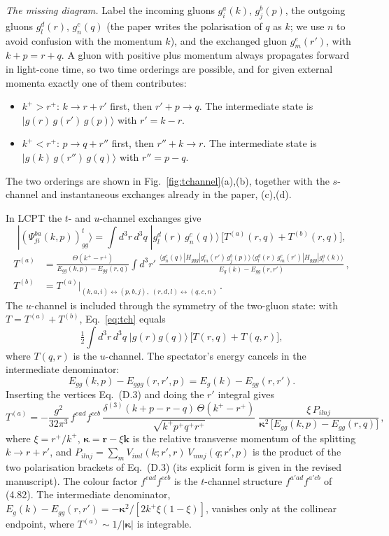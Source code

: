 \documentclass[11pt,a4paper]{article}
\newcommand{\bk}{\mathbf{k}}
\newcommand{\br}{\mathbf{r}}
\newcommand{\Hggg}{H_{ggg}}
\newcommand{\eq}[1]{Eq.~(#1)}
\begin{document}
\emph{The missing diagram.} Label the incoming gluons $g^a_i(k)$, $g^b_j(p)$, the outgoing gluons $g^d_l(r)$, $g^c_n(q)$ (the paper writes the polarisation of $q$ as $k$; we use $n$ to avoid confusion with the momentum $k$), and the exchanged gluon $g^e_m(r')$, with $k+p=r+q$. A gluon with positive plus momentum always propagates forward in light-cone time, so two time orderings are possible, and for given external momenta exactly one of them contributes:
\begin{itemize}[leftmargin=18pt,itemsep=2pt]
\item $k^+>r^+$: $k\to r+r'$ first, then $r'+p\to q$. The intermediate state is $|g(r)\,g(r')\,g(p)\rangle$ with $r'=k-r$.
\item $k^+<r^+$: $p\to q+r''$ first, then $r''+k\to r$. The intermediate state is $|g(k)\,g(r'')\,g(q)\rangle$ with $r''=p-q$.
\end{itemize}
The two orderings are shown in Fig.~\ref{fig:tchannel}(a),(b), together with the $s$-channel and instantaneous exchanges already in the paper, (c),(d).

\FigTchannel

In LCPT the $t$- and $u$-channel exchanges give
\begin{equation}
|(\Psi^{ba}_{ji}(k,p))^{t}_{gg}\rangle=\int d^3r\,d^3q\;|g^d_l(r)\,g^c_n(q)\rangle\,\big[T^{(a)}(r,q)+T^{(b)}(r,q)\big],
\label{eq:tch}
\end{equation}
\begin{align}
T^{(a)}&=\frac{\Theta(k^+-r^+)}{E_{gg}(k,p)-E_{gg}(r,q)}\int d^3r'\;\frac{\langle g^c_n(q)|\Hggg|g^e_m(r')\,g^b_j(p)\rangle\,\langle g^d_l(r)\,g^e_m(r')|\Hggg|g^a_i(k)\rangle}{E_g(k)-E_{gg}(r,r')}\,,\nonumber\\
T^{(b)}&=T^{(a)}\Big|_{(k,a,i)\leftrightarrow(p,b,j),\;(r,d,l)\leftrightarrow(q,c,n)}\,.
\label{eq:Tab}
\end{align}
The $u$-channel is included through the symmetry of the two-gluon state: with $T=T^{(a)}+T^{(b)}$, Eq.~\eqref{eq:tch} equals
\[
\tfrac12\int d^3r\,d^3q\;|g(r)g(q)\rangle\,\big[T(r,q)+T(q,r)\big],
\]
where $T(q,r)$ is the $u$-channel. The spectator's energy cancels in the intermediate denominator:
\[
E_{gg}(k,p)-E_{ggg}(r,r',p)=E_g(k)-E_{gg}(r,r').
\]
Inserting the vertices \eq{D.3} and doing the $r'$ integral gives
\begin{equation}
T^{(a)}=-\frac{g^2}{32\pi^3}\,f^{ead}f^{ecb}\,
\frac{\delta^{(3)}(k+p-r-q)\,\Theta(k^+-r^+)}{\sqrt{k^+p^+q^+r^+}}\;
\frac{\xi\,P_{ilnj}}{\boldsymbol\kappa^2\,\big[E_{gg}(k,p)-E_{gg}(r,q)\big]}\,,
\label{eq:Ta}
\end{equation}
where $\xi=r^+/k^+$, $\boldsymbol\kappa=\br-\xi\bk$ is the relative transverse momentum of the splitting $k\to r+r'$, and $P_{ilnj}=\sum_m V_{iml}(k;r',r)\,V_{nmj}(q;r',p)$ is the product of the two polarisation brackets of \eq{D.3} (its explicit form is given in the revised manuscript). The colour factor $f^{ead}f^{ecb}$ is the $t$-channel structure $f^{a'ad}f^{a'cb}$ of (4.82). The intermediate denominator, $E_g(k)-E_{gg}(r,r')=-\boldsymbol\kappa^2/[2k^+\xi(1-\xi)]$, vanishes only at the collinear endpoint, where $T^{(a)}\sim1/|\boldsymbol\kappa|$ is integrable.
\end{document}
